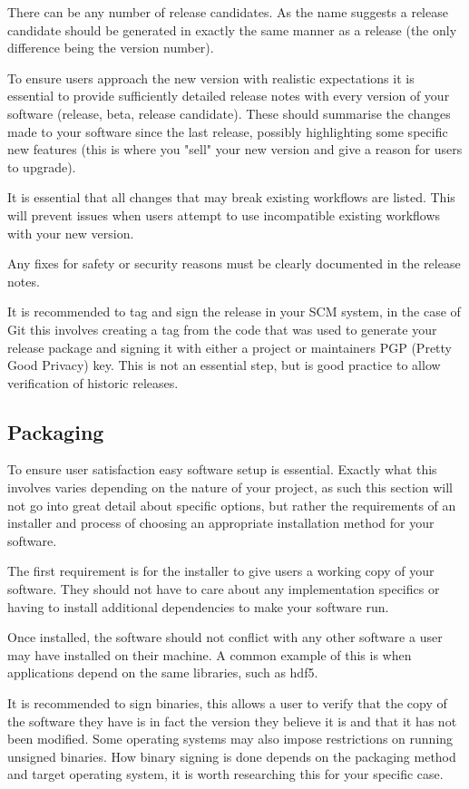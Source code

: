 \documentclass[jnr]{iosart2x}
\begin{document}
There can be any number of release candidates.
As the name suggests a release candidate should be generated in exactly the same manner as a release (the only difference being the version number).

To ensure users approach the new version with realistic expectations it is essential to provide sufficiently detailed release notes with every version of your software (release, beta, release candidate).
These should summarise the changes made to your software since the last release, possibly highlighting some specific new features (this is where you "sell" your new version and give a reason for users to upgrade).

It is essential that all changes that may break existing workflows are listed.
This will prevent issues when users attempt to use incompatible existing workflows with your new version.

Any fixes for safety or security reasons must be clearly documented in the release notes.

It is recommended to tag and sign the release in your SCM system, in the case of Git this involves creating a tag from the code that was used to generate your release package and signing it with either a project or maintainers PGP (Pretty Good Privacy) key.
This is not an essential step, but is good practice to allow verification of historic releases.

\subsection{Packaging}
\label{Packaging}

To ensure user satisfaction easy software setup is essential.
Exactly what this involves varies depending on the nature of your project, as such this section will not go into great detail about specific options, but rather the requirements of an installer and process of choosing an appropriate installation method for your software.

The first requirement is for the installer to give users a working copy of your software.
They should not have to care about any implementation specifics or having to install additional dependencies to make your software run.

Once installed, the software should not conflict with any other software a user may have installed on their machine.
A common example of this is when applications depend on the same libraries, such as hdf5.

It is recommended to sign binaries, this allows a user to verify that the copy of the software they have is in fact the version they believe it is and that it has not been modified.
Some operating systems may also impose restrictions on running unsigned binaries.
How binary signing is done depends on the packaging method and target operating system, it is worth researching this for your specific case.
\end{document}
